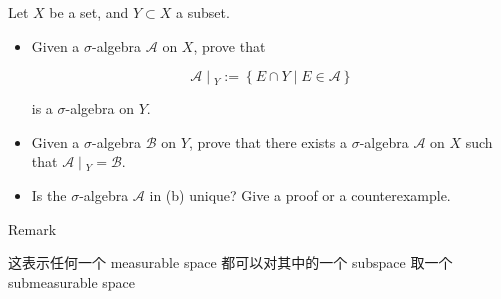 \documentclass{qlnotes-export}
\begin{document}
Let \(X\) be a set, and \(Y \subset X\) a subset.

\begin{itemize}
\item
  Given a \(\sigma\)-algebra \(\mathcal{A}\) on \(X\), prove that

  \[\left. \mathcal{A} \middle| {}_{Y} := \left\{ {E \cap Y \mid E \in \mathcal{A}} \right\} \right.\]

  is a \(\sigma\)-algebra on \(Y\).
\item
  Given a \(\sigma\)-algebra \(\mathcal{B}\) on \(Y\), prove that there exists a \(\sigma\)-algebra \(\mathcal{A}\) on \(X\) such that \(\left. \mathcal{A} \middle| {}_{Y} = \mathcal{B} \right.\).
\item
  Is the \(\sigma\)-algebra \(\mathcal{A}\) in (b) unique? Give a proof or a counterexample.
\end{itemize}

\begin{qlremark}{Remark}

这表示任何一个 measurable space 都可以对其中的一个 subspace 取一个 submeasurable space

\end{qlremark}
\end{document}
